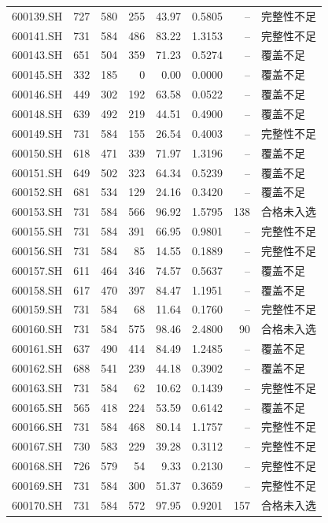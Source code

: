 \documentclass[10pt,a4paper]{article}
\begin{document}
\begin{longtable}{lrrr r r r l}
600139.SH & 727 & 580 & 255 & 43.97 & 0.5805 & -- & 完整性不足\\
600141.SH & 731 & 584 & 486 & 83.22 & 1.3153 & -- & 完整性不足\\
600143.SH & 651 & 504 & 359 & 71.23 & 0.5274 & -- & 覆盖不足\\
600145.SH & 332 & 185 & 0 & 0.00 & 0.0000 & -- & 覆盖不足\\
600146.SH & 449 & 302 & 192 & 63.58 & 0.0522 & -- & 覆盖不足\\
600148.SH & 639 & 492 & 219 & 44.51 & 0.4900 & -- & 覆盖不足\\
600149.SH & 731 & 584 & 155 & 26.54 & 0.4003 & -- & 完整性不足\\
600150.SH & 618 & 471 & 339 & 71.97 & 1.3196 & -- & 覆盖不足\\
600151.SH & 649 & 502 & 323 & 64.34 & 0.5239 & -- & 覆盖不足\\
600152.SH & 681 & 534 & 129 & 24.16 & 0.3420 & -- & 覆盖不足\\
600153.SH & 731 & 584 & 566 & 96.92 & 1.5795 & 138 & 合格未入选\\
600155.SH & 731 & 584 & 391 & 66.95 & 0.9801 & -- & 完整性不足\\
600156.SH & 731 & 584 & 85 & 14.55 & 0.1889 & -- & 完整性不足\\
600157.SH & 611 & 464 & 346 & 74.57 & 0.5637 & -- & 覆盖不足\\
600158.SH & 617 & 470 & 397 & 84.47 & 1.1951 & -- & 覆盖不足\\
600159.SH & 731 & 584 & 68 & 11.64 & 0.1760 & -- & 完整性不足\\
600160.SH & 731 & 584 & 575 & 98.46 & 2.4800 & 90 & 合格未入选\\
600161.SH & 637 & 490 & 414 & 84.49 & 1.2485 & -- & 覆盖不足\\
600162.SH & 688 & 541 & 239 & 44.18 & 0.3902 & -- & 覆盖不足\\
600163.SH & 731 & 584 & 62 & 10.62 & 0.1439 & -- & 完整性不足\\
600165.SH & 565 & 418 & 224 & 53.59 & 0.6142 & -- & 覆盖不足\\
600166.SH & 731 & 584 & 468 & 80.14 & 1.1757 & -- & 完整性不足\\
600167.SH & 730 & 583 & 229 & 39.28 & 0.3112 & -- & 完整性不足\\
600168.SH & 726 & 579 & 54 & 9.33 & 0.2130 & -- & 完整性不足\\
600169.SH & 731 & 584 & 300 & 51.37 & 0.3659 & -- & 完整性不足\\
600170.SH & 731 & 584 & 572 & 97.95 & 0.9201 & 157 & 合格未入选\\

\end{longtable}
\end{document}
